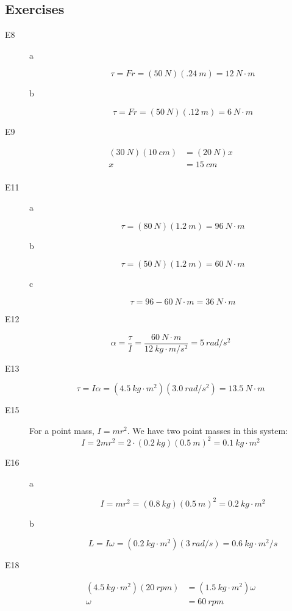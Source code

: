 \documentclass{exam}
\begin{document}
\subsection{Exercises}
\begin{description}

\item[E8]
\begin{description}
\item[a]
\[
  \tau = Fr = (50\ N)(.24\ m) = 12\ N \cdot m
\]

\item[b]
\[
  \tau = Fr = (50\ N)(.12\ m) = 6\ N \cdot m
\]

\end{description}

\item[E9]
\begin{align*}
  (30\ N) (10\ cm) &= (20\ N) x \\
  x &= 15\ cm \\
\end{align*}

\item[E11]
\begin{description}
\item[a]
\[
  \tau = (80\ N)(1.2\ m) = 96\ N \cdot m
\]

\item[b]
\[
  \tau = (50\ N)(1.2\ m) = 60\ N \cdot m
\]

\item[c]
\[
  \tau = 96 - 60\ N \cdot m = 36 \ N \cdot m
\]

\end{description}

\item[E12]
\[
  \alpha = \frac{\tau}{I} = \frac{60 \ N \cdot m}{12 \ kg \cdot m/s^2} = 5 \ rad/s^2
\]

\item[E13]
\[
  \tau = I \alpha = (4.5 \ kg \cdot m^2)(3.0 \ rad/s^2) = 13.5 \ N \cdot m
\]

\item[E15]
For a point mass, $I = mr^2$.  We have two point masses in this system:
\[
  I = 2 mr^2 = 2 \cdot (0.2 \ kg)(0.5 \ m)^2 = 0.1 \ kg \cdot m^2
\]

\item[E16]
\begin{description}
\item[a]
\[
  I = mr^2 = (0.8 \ kg)(0.5 \ m)^2 = 0.2 \ kg \cdot m^2
\]

\item[b]
\[
  L = I \omega = (0.2 \ kg \cdot m^2)(3 \ rad/s) = 0.6 \ kg \cdot m^2/s
\]
\end{description}

\item[E18]

\begin{align*}
  (4.5 \ kg \cdot m^2) (20 \ rpm) &= (1.5 \ kg \cdot m^2) \omega \\
  \omega &= 60 \ rpm \\
\end{align*}


\end{description}
\end{document}

